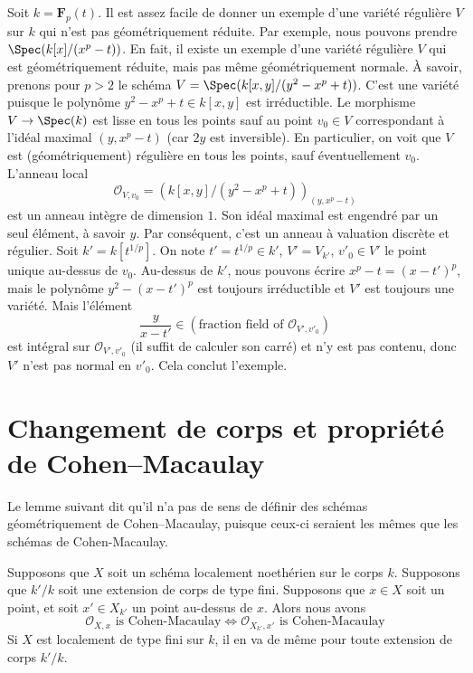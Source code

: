 \begin{example}
\label{example-geometrically-reduced-not-normal}
Soit $k =\mathbf{F}_p(t)$. Il est assez facile de donner un
exemple d'une variété régulière $V$ sur $k$ qui n'est pas
géométriquement réduite. Par exemple, nous pouvons prendre
$\Spec(k[x]/(x^p - t))$. En fait, il existe un exemple d'une
variété régulière $V$ qui est géométriquement réduite, mais pas même
géométriquement normale. À savoir, prenons pour $p > 2$ le schéma $V
= \Spec(k[x, y]/(y^2 - x^p + t))$. C'est une variété puisque le
polynôme $y^2 - x^p + t \in k[x, y]$ est irréductible. Le morphisme
$V \to \Spec(k)$ est lisse en tous les points sauf au point $v_0 \in
V$ correspondant à l'idéal maximal $(y, x^p - t)$ (car $2y$ est
inversible). En particulier, on voit que $V$ est (géométriquement)
régulière en tous les points, sauf éventuellement $v_0$. L'anneau local
$$
\mathcal{O}_{V, v_0} = \left(k[x, y]/(y^2 - x^p + t)\right)_{(y, x^p - t)}
$$
est un anneau intègre de dimension $1$. Son idéal maximal est engendré
par un seul élément, à savoir $y$. Par conséquent, c'est un anneau
à valuation discrète et régulier. Soit $k' = k[t^{1/p}]$. On note
$t' = t^{1/p} \in k'$, $V' = V_{k'}$, $v'_0 \in V'$ le point
unique au-dessus de $v_0$. Au-dessus de $k'$, nous pouvons écrire
$x^p - t = (x - t')^p$, mais le polynôme $y^2 - (x - t')^p$ est
toujours irréductible et $V'$ est toujours une variété. Mais l'élément
$$
\frac{y}{x - t'} \in (\text{fraction field of }\mathcal{O}_{V', v'_0})
$$
est intégral sur $\mathcal{O}_{V', v'_0}$ (il suffit
de calculer son carré) et n'y est pas contenu, donc
$V'$ n'est pas normal en $v'_0$. Cela conclut l'exemple.
\end{example}







\section{Changement de corps et propriété de Cohen--Macaulay}
\label{section-CM}

\noindent
Le lemme suivant dit qu'il n'a pas de sens de définir
des schémas géométriquement de Cohen--Macaulay, puisque
ceux-ci seraient les mêmes que les schémas de Cohen-Macaulay.

\begin{lemma}
\label{lemma-CM-base-change}
Supposons que $X$ soit un schéma localement noethérien sur le
corps $k$. Supposons que $k'/k$ soit une extension de corps de
type fini. Supposons que $x \in X$ soit un point, et soit $x'
\in X_{k'}$ un point au-dessus de $x$. Alors nous avons
$$
\mathcal{O}_{X, x}\text{ is Cohen-Macaulay}
\Leftrightarrow
\mathcal{O}_{X_{k'}, x'}\text{ is Cohen-Macaulay}
$$
Si $X$ est localement de type fini sur $k$, il en
va de même pour toute extension de corps $k'/k$.
\end{lemma}

